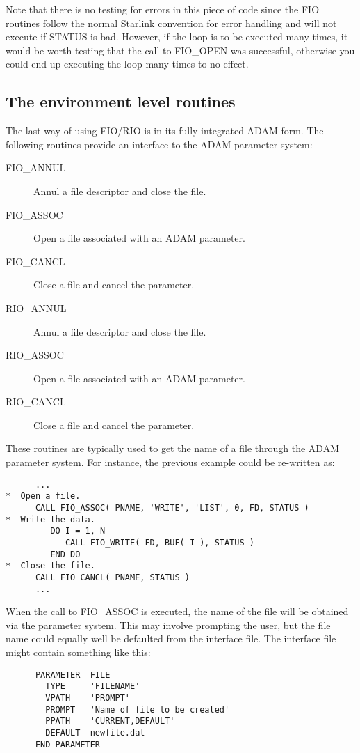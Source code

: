 Note that there is no testing for errors in this piece of code since the FIO
routines follow the normal Starlink convention for error handling and will not
execute if STATUS is bad. However, if the loop is to be executed many times, it
would be worth testing that the call to FIO\_OPEN was successful, otherwise you
could end up executing the loop many times to no effect.

\subsection{The environment level routines}

The last way of using FIO/RIO is in its fully integrated ADAM form. The
following routines provide an interface to the ADAM parameter system:

\begin{description}
\item[FIO\_ANNUL] Annul a file descriptor and close the file.
\item[FIO\_ASSOC] Open a file associated with an ADAM parameter.
\item[FIO\_CANCL] Close a file and cancel the parameter.
\item[RIO\_ANNUL] Annul a file descriptor and close the file.
\item[RIO\_ASSOC] Open a file associated with an ADAM parameter.
\item[RIO\_CANCL] Close a file and cancel the parameter.
\end{description}

These routines are typically used to get the name of a file through the ADAM
parameter system. For instance, the previous example could be re-written as:

\begin{verbatim}
      ...
*  Open a file.
      CALL FIO_ASSOC( PNAME, 'WRITE', 'LIST', 0, FD, STATUS )
*  Write the data.
         DO I = 1, N
            CALL FIO_WRITE( FD, BUF( I ), STATUS )
         END DO
*  Close the file.
      CALL FIO_CANCL( PNAME, STATUS )
      ...
\end{verbatim}

When the call to FIO\_ASSOC is executed, the name of the file will be obtained
via the parameter system. This may involve prompting the user, but the file
name could equally well be defaulted from the interface file. The interface
file might contain something like this:

\begin{verbatim}
      PARAMETER  FILE
        TYPE     'FILENAME'
        VPATH    'PROMPT'
        PROMPT   'Name of file to be created'
        PPATH    'CURRENT,DEFAULT'
        DEFAULT  newfile.dat
      END PARAMETER
\end{verbatim}

